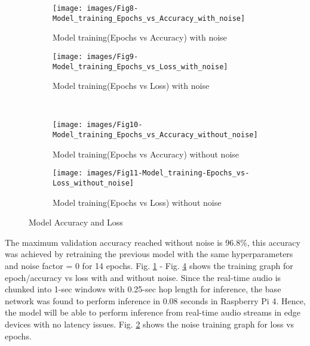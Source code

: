 \documentclass[10pt,twocolumn]{article}
\begin{document}
\begin{figure*} [htbp]
\begin{subfigure}{0.5\textwidth}
  \centering
  \texttt{[image: images/Fig8-Model\_training\_Epochs\_vs\_Accuracy\_with\_noise]}  
  \caption{Model training(Epochs vs Accuracy) with noise}
  \label{FIG:EpochvsAcc1}
\end{subfigure}
\begin{subfigure}{.5\textwidth}
  \centering
  \texttt{[image: images/Fig9-Model\_training\_Epochs\_vs\_Loss\_with\_noise]}  
  \caption{Model training(Epochs vs Loss) with noise}
  \label{FIG:EpochvsLoss1}
\end{subfigure}\\
\begin{subfigure}{.5\textwidth}
  \centering
  \texttt{[image: images/Fig10-Model\_training\_Epochs\_vs\_Accuracy\_without\_noise]}  
\caption{Model training(Epochs vs Accuracy) without noise}
 \label{FIG:EpochvsAcc2}
  \end{subfigure}
\begin{subfigure}{.5\textwidth}
  \centering
  \texttt{[image: images/Fig11-Model\_training-Epochs\_vs-Loss\_without\_noise]}  
\caption{Model training(Epochs vs Loss) without noise}
  \label{FIG:EpochvsLoss2}
  \end{subfigure}
\caption{Model Accuracy and Loss}
\label{fig:model_accuracy_loss}
\end{figure*}

The maximum validation accuracy reached without noise is 96.8\%, this accuracy was achieved by retraining the previous model with the same hyperparameters and noise factor = 0 for 14 epochs. Fig. \ref{FIG:EpochvsAcc1} - Fig. \ref{FIG:EpochvsLoss2} shows the training graph for epoch/accuracy vs loss with and without noise.  Since the real-time audio is chunked into 1-sec windows with 0.25-sec hop length for inference, the base network was found to perform inference in 0.08 seconds in Raspberry Pi 4. Hence, the model will be able to perform inference from real-time audio streams in edge devices with no latency issues. Fig. \ref{FIG:EpochvsLoss1} shows the noise training graph for loss vs epochs.
\end{document}
